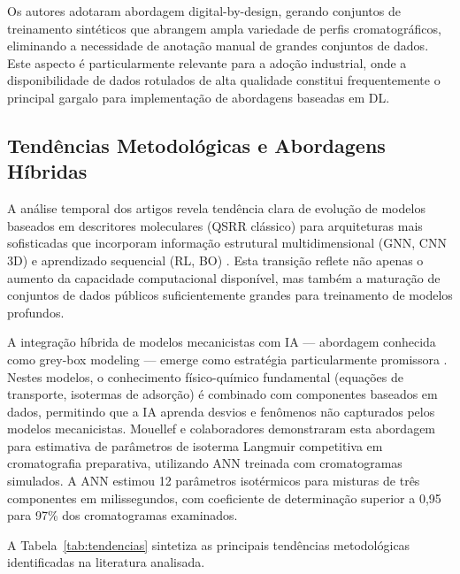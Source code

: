 \documentclass[preprint,12pt]{elsarticle}
\begin{document}
Os autores adotaram abordagem digital-by-design, gerando conjuntos de treinamento sintéticos que abrangem ampla variedade de perfis cromatográficos, eliminando a necessidade de anotação manual de grandes conjuntos de dados. Este aspecto é particularmente relevante para a adoção industrial, onde a disponibilidade de dados rotulados de alta qualidade constitui frequentemente o principal gargalo para implementação de abordagens baseadas em DL.

\subsection{Tendências Metodológicas e Abordagens Híbridas}

A análise temporal dos artigos revela tendência clara de evolução de modelos baseados em descritores moleculares (QSRR clássico) para arquiteturas mais sofisticadas que incorporam informação estrutural multidimensional (GNN, CNN 3D) e aprendizado sequencial (RL, BO) \cite{szucs2023, singh2024}. Esta transição reflete não apenas o aumento da capacidade computacional disponível, mas também a maturação de conjuntos de dados públicos suficientemente grandes para treinamento de modelos profundos.

A integração híbrida de modelos mecanicistas com IA — abordagem conhecida como grey-box modeling — emerge como estratégia particularmente promissora \cite{mouellef2021, sulthana2026}. Nestes modelos, o conhecimento físico-químico fundamental (equações de transporte, isotermas de adsorção) é combinado com componentes baseados em dados, permitindo que a IA aprenda desvios e fenômenos não capturados pelos modelos mecanicistas. Mouellef e colaboradores \cite{mouellef2021} demonstraram esta abordagem para estimativa de parâmetros de isoterma Langmuir competitiva em cromatografia preparativa, utilizando ANN treinada com cromatogramas simulados. A ANN estimou 12 parâmetros isotérmicos para misturas de três componentes em milissegundos, com coeficiente de determinação superior a 0,95 para 97\% dos cromatogramas examinados.

A Tabela~\ref{tab:tendencias} sintetiza as principais tendências metodológicas identificadas na literatura analisada.
\end{document}
